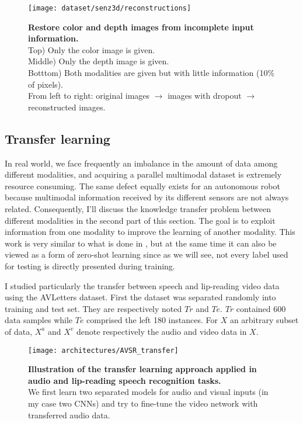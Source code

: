\begin{figure}[H]
  \centering
  \texttt{[image: dataset/senz3d/reconstructions]}
  \caption{%
    \textbf{Restore color and depth images from incomplete input
      information.}\\[0.1em]
    Top) Only the color image is given.\\[0.1em]
    Middle) Only the depth image is given.\\[0.1em]
    Botttom) Both modalities are given but with little information
      (10\% of pixels).\\[0.1em]
    From left to right: original images $\rightarrow$ images with
      dropout $\rightarrow$ reconstructed images.
    }
  \label{fig:color_depth_restoration}
\end{figure}

\subsection{Transfer learning} \label{subsection:AVSR_transfer}

In real world, we face frequently an imbalance in the amount of data
among different modalities, and acquiring a parallel multimodal
dataset is extremely resource consuming.
The same defect equally exists for an autonomous robot because
multimodal information received by its different sensors are not always
related.
Consequently, I'll discuss the knowledge transfer problem between
different modalities in the second part of this section.
The goal is to exploit information from one modality to improve the
learning of another modality.
This work is very similar to what is done in \cite{S. Moon 2015},
but at the same time it can also be viewed as a form of zero-shot
learning \cite{A. Frome 2013, R. Socher 2013} since as we will see,
not every label used for testing is directly presented during training.

I studied particularly the transfer between speech and lip-reading
video data using the AVLetters dataset. First the dataset was separated
randomly into training and test set.
They are respectively noted $Tr$ and $Te$.
$Tr$ contained 600 data samples while $Te$ comprised the left 180 instances.
For $X$ an arbitrary subset of data, $X^a$ and $X^v$ denote respectively
the audio and video data in $X$.

\begin{figure}[!b]
  \centering
  \texttt{[image: architectures/AVSR\_transfer]}
  \caption{%
    \textbf{Illustration of the transfer learning approach applied in
      audio and lip-reading speech recognition tasks.}\\[0.1em]
    We first learn two separated models for audio and visual inputs
      (in my case two CNNs) and try to fine-tune the video network
      with transferred audio data.
    }
  \label{fig:AVSR_transfer}
\end{figure}

